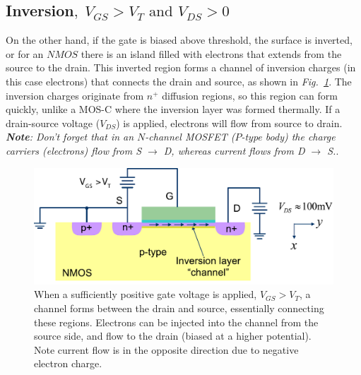 \subsection{Inversion\texorpdfstring{$,\;V_{GS}>V_T\text{ and }V_{DS}>0$}{}}
On the other hand, if the gate is biased above threshold, the surface is inverted, or for an $NMOS$ there is an island filled with electrons that extends from the source to the drain.  This inverted region forms a channel of inversion charges (in this case electrons) that connects the drain and source, as shown in \emph{Fig.~\ref{fig:mos_triode}}.  The inversion charges originate from $n^+$ diffusion regions, so this region can form quickly, unlike a MOS-C where the inversion layer was formed thermally.  If a drain-source voltage ($V_{DS}$) is applied, electrons will flow from source to drain.\\[0.25cm]
\noindent
\textit{\textbf{Note}: Don't forget that in an $N$-channel MOSFET ($P$-type body) the charge carriers (electrons) flow from S $\rightarrow$ D, whereas current flows from D $\rightarrow$ S.\newline{}}.
\newpage
\begin{figure}[t]
\centering
\includegraphics[width=\columnwidth]{mos_triode}
\caption{When a sufficiently positive gate voltage is applied, $V_{GS} > V_T$, a channel forms between the drain and source, essentially connecting these regions.  Electrons can be injected into the channel from the source side, and flow to the drain (biased at a higher potential).  Note current flow is in the opposite direction due to negative electron charge.}
\label{fig:mos_triode}
\end{figure}

